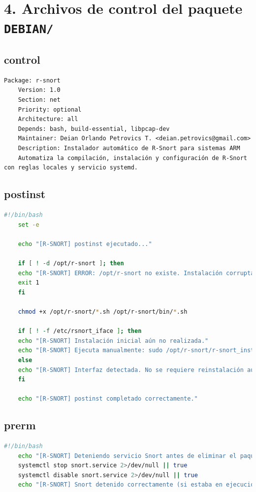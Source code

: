 \documentclass[11pt,a4paper,twoside]{report}
\begin{document}
\section*{4. Archivos de control del paquete \texttt{DEBIAN/}}

\subsection*{control}
\begin{lstlisting}[language={}, caption={Archivo control}, label={lst:control}]
	Package: r-snort
	Version: 1.0
	Section: net
	Priority: optional
	Architecture: all
	Depends: bash, build-essential, libpcap-dev
	Maintainer: Deian Orlando Petrovics T. <deian.petrovics@gmail.com>
	Description: Instalador automático de R-Snort para sistemas ARM
	Automatiza la compilación, instalación y configuración de R-Snort con reglas locales y servicio systemd.
\end{lstlisting}

\subsection*{postinst}
\begin{lstlisting}[language=bash, caption={Script postins}, label={lst:postinst}]
	#!/bin/bash
	set -e
	
	echo "[R-SNORT] postinst ejecutado..."
	
	if [ ! -d /opt/r-snort ]; then
	echo "[R-SNORT] ERROR: /opt/r-snort no existe. Instalación corrupta."
	exit 1
	fi
	
	chmod +x /opt/r-snort/*.sh /opt/r-snort/bin/*.sh
	
	if [ ! -f /etc/rsnort_iface ]; then
	echo "[R-SNORT] Instalación inicial aún no realizada."
	echo "[R-SNORT] Ejecuta manualmente: sudo /opt/r-snort/r-snort_installer.sh"
	else
	echo "[R-SNORT] Interfaz detectada. No se requiere reinstalación automática."
	fi
	
	echo "[R-SNORT] postinst completado correctamente."
\end{lstlisting}

\pagebreak

\subsection*{prerm}
\begin{lstlisting}[language=bash, caption={Script prerm}, label={lst:prerm}]
	#!/bin/bash
	echo "[R-SNORT] Deteniendo servicio Snort antes de eliminar el paquete..."
	systemctl stop snort.service 2>/dev/null || true
	systemctl disable snort.service 2>/dev/null || true
	echo "[R-SNORT] Snort detenido correctamente (si estaba en ejecución)."
\end{lstlisting}
\end{document}
